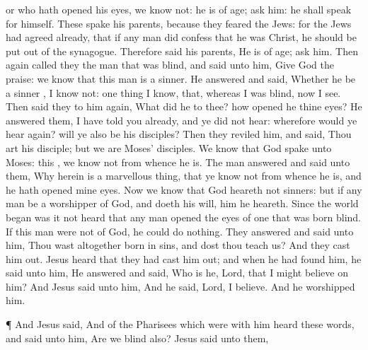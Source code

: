 {or
who hath
opened
his
eyes,
we
know
not:
he is
of
age;
ask
him:
he shall
speak
for
himself.
These
{}
spake
his
parents,
because they
feared the
Jews:
for the
Jews had
agreed
already,
that
if any
man did
confess that he
was
Christ, he should be
put out of the
synagogue.
Therefore
said
his
parents, He
is of
age;
ask
him.
Then
again called
they the
man
that
was
blind,
and
said unto
him,
Give
God the
praise:
we
know
that
this
man
is a
sinner.
He
answered
and
said,
Whether he
be a
sinner
{}, I
know
not: one
thing I
know,
that, whereas I
was
blind,
now I
see.
Then said
they to
him
again,
What did
he to
thee?
how opened
he
thine
eyes?
He
answered
them, I have
told
you
already,
and ye
did
not
hear:
wherefore would
ye
hear
{}
again?
will
ye
also
be
his
disciples?
Then they
reviled
him,
and
said,
Thou
art
his
disciple;
but
we
are
Moses’
disciples.
We
know
that
God
spake unto
Moses:
{}
this
{}, we
know
not from
whence he
is.
The
man
answered
and
said unto
them,
Why
herein
is a marvellous
thing,
that
ye
know
not from
whence he
is,
and
{} he hath
opened
mine
eyes.
Now we
know
that
God
heareth
not
sinners:
but
if any
man
be a worshipper of
God,
and
doeth
his
will,
him he
heareth.
Since the world
began was
it
not
heard
that any
man
opened the
eyes of one that was
born
blind.
If this
man
were
not
of
God, he
could
do
nothing.
They
answered
and
said unto
him,
Thou
wast
altogether
born
in
sins,
and
dost
thou
teach
us?
And they
cast
him
out.
Jesus
heard
that they had
cast
him
out;
and when he had
found
him, he
said unto
him,
{}
He
answered
and
said,
Who is
he,
Lord,
that I might
believe
on
him?
And
Jesus
said unto
him,
{}
And
he
said,
Lord, I
believe.
And he
worshipped
him.
\par }{\PP {}¶
And
Jesus
said,
{}
And
{}
of the
Pharisees which
were
with
him
heard these
words,
and
said unto
him,
Are
we
blind
also?
Jesus
said unto
them,
{}

}
